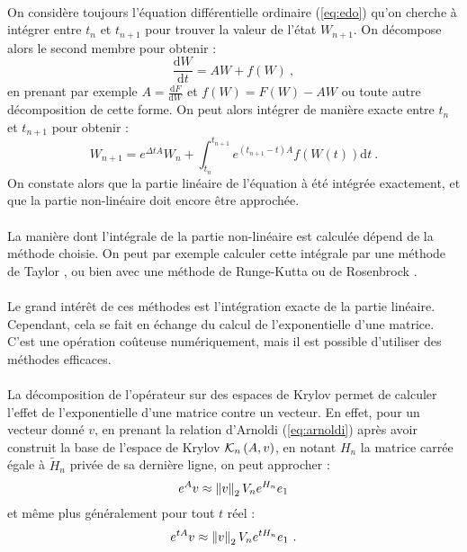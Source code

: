     \paragraph{}
    On considère toujours l'équation différentielle ordinaire (\ref{eq:edo}) qu'on cherche à intégrer entre $t_n$ et $t_{n+1}$ pour trouver la valeur de l'état $W_{n+1}$.
    On décompose alors le second membre pour obtenir :
    \[\frac{\mathrm{d}W}{\mathrm{d}t} = AW + f\left(W\right)\ ,\]
    en prenant par exemple $A = \frac{\mathrm{d}F}{\mathrm{d}W}$ et $f\left(W\right) = F\left(W\right) - AW$ ou toute autre décomposition de cette forme.
    On peut alors intégrer de manière exacte entre $t_n$ et $t_{n+1}$ pour obtenir :
    \[W_{n+1} = e^{\Delta tA}W_n + \int_{t_n}^{t_{n+1}}e^{\left(t_{n+1}-t\right)A}f\left(W\left(t\right)\right)\mathrm{d}t\ .\]
    On constate alors que la partie linéaire de l'équation à été intégrée exactement, et que la partie non-linéaire doit encore être approchée.

    \paragraph{}
    La manière dont l'intégrale de la partie non-linéaire est calculée dépend de la méthode choisie.
    On peut par exemple calculer cette intégrale par une méthode de Taylor \cite{KoskelaOstermann2013}, ou bien avec une méthode de Runge-Kutta ou de Rosenbrock \cite{HochbruckOstermann2010}.

    \paragraph{}
    Le grand intérêt de ces méthodes est l'intégration exacte de la partie linéaire.
    Cependant, cela se fait en échange du calcul de l'exponentielle d'une matrice.
    C'est une opération coûteuse numériquement, mais il est possible d'utiliser des méthodes efficaces.

    \paragraph{}
    La décomposition de l'opérateur sur des espaces de Krylov permet de calculer l'effet de l'exponentielle d'une matrice contre un vecteur.
    En effet, pour un vecteur donné $v$, en prenant la relation d'Arnoldi (\ref{eq:arnoldi}) après avoir construit la base de l'espace de Krylov $\krylov[A, v]{n}$, en notant $H_n$ la matrice carrée égale à $\widetilde{H}_n$ privée de sa dernière ligne, on peut approcher \cite{Saad1992} :
    \[e^Av \approx \norm[2]{v} V_ne^{H_n}e_1\]
    et même plus généralement pour tout $t$ réel :
    \[e^{tA}v \approx \norm[2]{v} V_ne^{tH_n}e_1\ .\]

